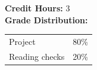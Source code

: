 \documentclass[11pt]{article}\usepackage[]{graphicx}\usepackage[]{color}
\begin{document}

\textbf {Credit Hours:} 3 \\



%

\textbf {\large Grade Distribution:} \\
\hspace*{40mm}
\begin{tabular}{ l l }
Project & 80\% \\
Reading checks & 20\% \\ 
\end{tabular} \\\\


\end{document}
